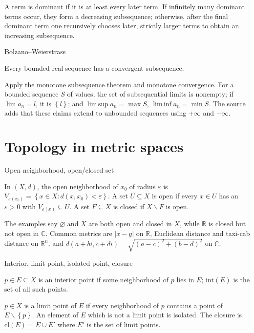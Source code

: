 A term is dominant if it is at least every later term. If infinitely many dominant terms occur, they form a decreasing subsequence; otherwise, after the final dominant term one recursively chooses later, strictly larger terms to obtain an increasing subsequence.

\begin{theorem}{Bolzano--Weierstrass}

Every bounded real sequence has a convergent subsequence.

\end{theorem}

Apply the monotone subsequence theorem and monotone convergence. For a bounded sequence \(S\) of values, the set of subsequential limits is nonempty; if \(\lim a_{n} = l\), it is \(\left\{ l \right\}\); and \(\operatorname{lim\, sup}a_{n} = \max S\), \(\operatorname{lim\, inf}a_{n} = \min S\). The source adds that these claims extend to unbounded sequences using \(+ \infty\) and \(- \infty\).

\section{Topology in metric spaces}

\begin{definition}{Open neighborhood, open/closed set}

In \(\left( {X,d} \right)\), the open neighborhood of \(x_{0}\) of radius \(\varepsilon\) is \(V_{\varepsilon{(x_{0})}} = \left\{ {x \in X:d\left( {x,x_{0}} \right) < \varepsilon} \right\}\). A set \(U \subseteq X\) is open if every \(x \in U\) has an \(\varepsilon > 0\) with \(V_{\varepsilon{(x)}} \subseteq U\). A set \(F \subseteq X\) is closed if \(X \smallsetminus F\) is open.

\end{definition}

The examples say \(\varnothing\) and \(X\) are both open and closed in \(X\), while \(\mathbb{R}\) is closed but not open in \(\mathbb{C}\). Common metrics are \(\left| {x - y} \right|\) on \(\mathbb{R}\), Euclidean distance and taxi-cab distance on \(\mathbb{R}^{n}\), and \(d\left( {a + bi,c + di} \right) = \sqrt{\left( {a - c} \right)^{2} + \left( {b - d} \right)^{2}}\) on \(\mathbb{C}\).

\begin{definition}{Interior, limit point, isolated point, closure}

\(p \in E \subseteq X\) is an interior point if some neighborhood of \(p\) lies in \(E\); \(\text{int}(E)\) is the set of all such points.

\(p \in X\) is a limit point of \(E\) if every neighborhood of \(p\) contains a point of \(E \smallsetminus \left\{ p \right\}\). An element of \(E\) which is not a limit point is isolated. The closure is \(\text{cl}(E) = E \cup E'\) where \(E'\) is the set of limit points.

\end{definition}

